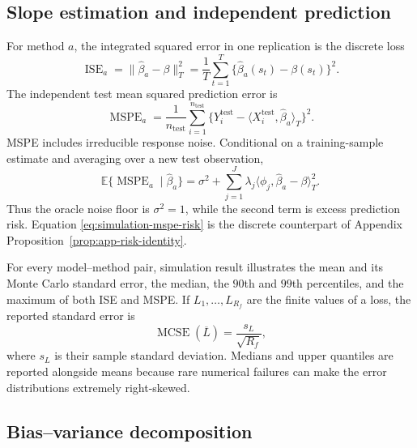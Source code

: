 \subsection{Slope estimation and independent prediction}

For method $a$, the integrated squared error in one replication is the
discrete loss
\begin{equation}
    \operatorname{ISE}_{a}
    =\|\widehat\beta_a-\beta\|_T^2
    =\frac1T\sum_{t=1}^{T}
      \{\widehat\beta_a(s_t)-\beta(s_t)\}^2.
    \label{eq:simulation-ise}
\end{equation}
The independent test mean squared prediction error is
\begin{equation}
    \operatorname{MSPE}_{a}
    =\frac1{n_{\mathrm{test}}}
      \sum_{i=1}^{n_{\mathrm{test}}}
      \{Y_i^{\mathrm{test}}
      -\langle X_i^{\mathrm{test}},\widehat\beta_a\rangle_T\}^2.
    \label{eq:simulation-mspe}
\end{equation}
MSPE includes irreducible response noise.  Conditional on a training-sample
estimate and averaging over a new test observation,
\begin{equation}
    \mathbb E\{\operatorname{MSPE}_{a}\mid\widehat\beta_a\}
    =\sigma^2+
      \sum_{j=1}^{J}\lambda_j
      \langle\phi_j,\widehat\beta_a-\beta\rangle_T^2.
    \label{eq:simulation-mspe-risk}
\end{equation}
Thus the oracle noise floor is $\sigma^2=1$, while the second term is excess
prediction risk.  Equation \eqref{eq:simulation-mspe-risk} is the discrete
counterpart of Appendix Proposition~\ref{prop:app-risk-identity}.

For every model--method pair, simulation result illustrates the mean and its Monte Carlo
standard error, the median, the $90$th and $99$th percentiles, and the maximum
of both ISE and MSPE.  If $L_1,\ldots,L_{R_f}$ are the finite values of a loss,
the reported standard error is
\begin{equation}
    \operatorname{MCSE}(\overline L)
    =\frac{s_L}{\sqrt{R_f}},
    \label{eq:simulation-mcse}
\end{equation}
where $s_L$ is their sample standard deviation.  Medians and upper quantiles
are reported alongside means because rare numerical failures can make the
error distributions extremely right-skewed.

\subsection{Bias--variance decomposition}

